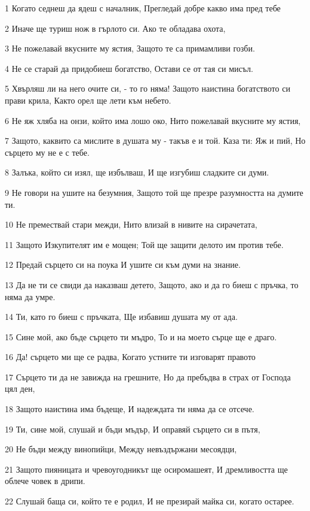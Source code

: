 \par 1 Когато седнеш да ядеш с началник, Прегледай добре какво има пред тебе
\par 2 Иначе ще туриш нож в гърлото си. Ако те обладава охота,
\par 3 Не пожелавай вкусните му ястия, Защото те са примамливи гозби.
\par 4 Не се старай да придобиеш богатство, Остави се от тая си мисъл.
\par 5 Хвърляш ли на него очите си, - то го няма! Защото наистина богатството си прави крила, Както орел ще лети към небето.
\par 6 Не яж хляба на онзи, който има лошо око, Нито пожелавай вкусните му ястия,
\par 7 Защото, каквито са мислите в душата му - такъв е и той. Каза ти: Яж и пий, Но сърцето му не е с тебе.
\par 8 Залъка, който си изял, ще избълваш, И ще изгубиш сладките си думи.
\par 9 Не говори на ушите на безумния, Защото той ще презре разумността на думите ти.
\par 10 Не премествай стари межди, Нито влизай в нивите на сирачетата,
\par 11 Защото Изкупителят им е мощен; Той ще защити делото им против тебе.
\par 12 Предай сърцето си на поука И ушите си към думи на знание.
\par 13 Да не ти се свиди да наказваш детето, Защото, ако и да го биеш с пръчка, то няма да умре.
\par 14 Ти, като го биеш с пръчката, Ще избавиш душата му от ада.
\par 15 Сине мой, ако бъде сърцето ти мъдро, То и на моето сърце ще е драго.
\par 16 Да! сърцето ми ще се радва, Когато устните ти изговарят правото
\par 17 Сърцето ти да не завижда на грешните, Но да пребъдва в страх от Господа цял ден,
\par 18 Защото наистина има бъдеще, И надеждата ти няма да се отсече.
\par 19 Ти, сине мой, слушай и бъди мъдър, И оправяй сърцето си в пътя,
\par 20 Не бъди между винопийци, Между невъздържани месоядци,
\par 21 Защото пияницата и чревоугодникът ще осиромашеят, И дремливостта ще облече човек в дрипи.
\par 22 Слушай баща си, който те е родил, И не презирай майка си, когато остарее.
